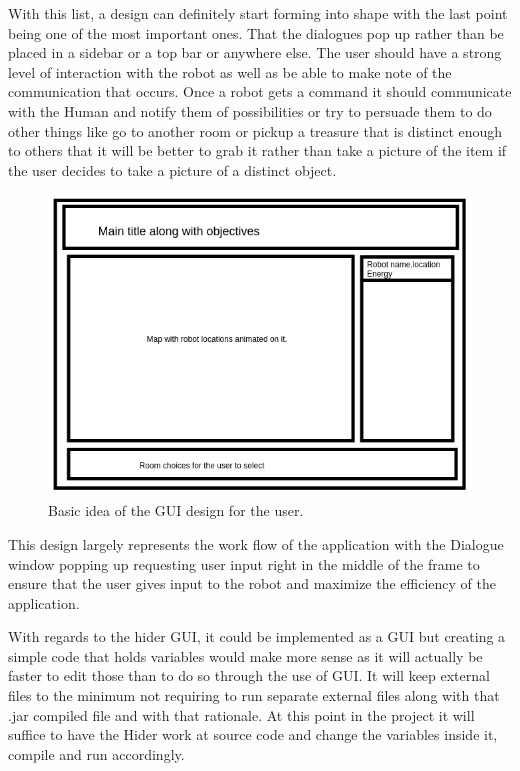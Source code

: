 \documentclass{report}
\begin{document}
        With this list, a design can definitely start forming into shape with the last point being one of the most important ones. That the dialogues pop up rather than be placed in a sidebar or a top bar or anywhere else. The user should have a strong level of interaction with the robot as well as be able to make note of the communication that occurs. Once a robot gets a command it should communicate with the Human and notify them of possibilities or try to persuade them to do other things like go to another room or pickup a treasure that is distinct enough to others that it will be better to grab it rather than take a picture of the item if the user decides to take a picture of a distinct object.

          \begin{figure}[!ht]  
            \centering
              \includegraphics[width=1\textwidth]{figures/GUIDesign.png}
              \caption{Basic idea of the GUI design for the user.}
          \end{figure}

        This design largely represents the work flow of the application with the Dialogue window popping up requesting user input right in the middle of the frame to ensure that the user gives input to the robot and maximize the efficiency of the application.

        With regards to the hider GUI, it could be implemented as a GUI but creating a simple code that holds variables would make more sense as it will actually be faster to edit those than to do so through the use of GUI. It will keep external files to the minimum not requiring to run separate external files along with that .jar compiled file and with that rationale. At this point in the project it will suffice to have the Hider work at source code and change the variables inside it, compile and run accordingly.
\end{document}
